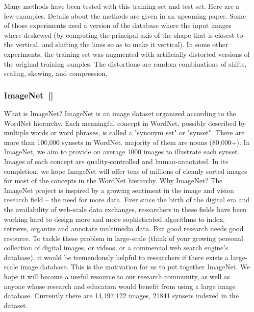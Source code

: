 Many methods have been tested with this training set and test set. Here are a few examples. Details about the methods are given in an upcoming paper. Some of those experiments used a version of the database where the input images where deskewed (by computing the principal axis of the shape that is closest to the vertical, and shifting the lines so as to make it vertical). In some other experiments, the training set was augmented with artificially distorted versions of the original training samples. The distortions are random combinations of shifts, scaling, skewing, and compression. 

\subsubsection{ImageNet~[\cite{deng_imagenet:_2009}]}
 What is ImageNet?
ImageNet is an image dataset organized according to the WordNet hierarchy. Each meaningful concept in WordNet, possibly described by multiple words or word phrases, is called a "synonym set" or "synset". There are more than 100,000 synsets in WordNet, majority of them are nouns (80,000+). In ImageNet, we aim to provide on average 1000 images to illustrate each synset. Images of each concept are quality-controlled and human-annotated. In its completion, we hope ImageNet will offer tens of millions of cleanly sorted images for most of the concepts in the WordNet hierarchy.
Why ImageNet?
The ImageNet project is inspired by a growing sentiment in the image and vision research field – the need for more data. Ever since the birth of the digital era and the availability of web-scale data exchanges, researchers in these fields have been working hard to design more and more sophisticated algorithms to index, retrieve, organize and annotate multimedia data. But good research needs good resource. To tackle these problem in large-scale (think of your growing personal collection of digital images, or videos, or a commercial web search engine’s database), it would be tremendously helpful to researchers if there exists a large-scale image database. This is the motivation for us to put together ImageNet. We hope it will become a useful resource to our research community, as well as anyone whose research and education would benefit from using a large image database. 
Currently there are 14,197,122 images, 21841 synsets indexed in the dataset. 
